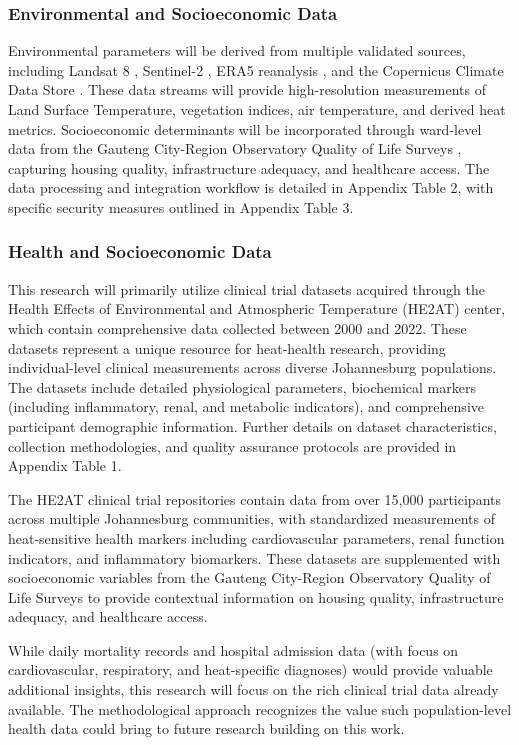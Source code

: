 \subsubsection{Environmental and Socioeconomic Data}
Environmental parameters will be derived from multiple validated sources, including Landsat 8 \citep{landsat8}, Sentinel-2 \citep{sentinel2}, ERA5 reanalysis \citep{era5}, and the Copernicus Climate Data Store \citep{copernicus_climate_data_store}. These data streams will provide high-resolution measurements of Land Surface Temperature, vegetation indices, air temperature, and derived heat metrics. Socioeconomic determinants will be incorporated through ward-level data from the Gauteng City-Region Observatory Quality of Life Surveys \citep{gcro_qol_survey}, capturing housing quality, infrastructure adequacy, and healthcare access. The data processing and integration workflow is detailed in Appendix Table 2, with specific security measures outlined in Appendix Table 3.

\subsubsection{Health and Socioeconomic Data}
This research will primarily utilize clinical trial datasets acquired through the Health Effects of Environmental and Atmospheric Temperature (HE2AT) center, which contain comprehensive data collected between 2000 and 2022. These datasets represent a unique resource for heat-health research, providing individual-level clinical measurements across diverse Johannesburg populations. The datasets include detailed physiological parameters, biochemical markers (including inflammatory, renal, and metabolic indicators), and comprehensive participant demographic information. Further details on dataset characteristics, collection methodologies, and quality assurance protocols are provided in Appendix Table 1.

The HE2AT clinical trial repositories contain data from over 15,000 participants across multiple Johannesburg communities, with standardized measurements of heat-sensitive health markers including cardiovascular parameters, renal function indicators, and inflammatory biomarkers. These datasets are supplemented with socioeconomic variables from the Gauteng City-Region Observatory Quality of Life Surveys to provide contextual information on housing quality, infrastructure adequacy, and healthcare access.

While daily mortality records and hospital admission data (with focus on cardiovascular, respiratory, and heat-specific diagnoses) would provide valuable additional insights, this research will focus on the rich clinical trial data already available. The methodological approach recognizes the value such population-level health data could bring to future research building on this work.

